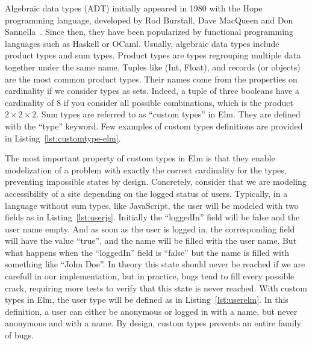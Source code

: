 Algebraic data types (ADT) initially appeared in 1980 with the Hope programming language,
developed by Rod Burstall, Dave MacQueen and Don Sannella~\cite{burstall1980hope}.
Since then, they have been popularized by functional programming languages
such as Haskell or OCaml.
Usually, algebraic data types include product types and sum types.
Product types are types regrouping multiple data together under the same name.
Tuples like (Int, Float), and records (or objects) are the most common product types.
Their names come from the properties on cardinality if we consider types as sets.
Indeed, a tuple of three booleans have a cardinality of 8 if you consider
all possible combinations, which is the product $2\times2\times2$.
Sum types are referred to as ``custom types'' in Elm.
They are defined with the ``type'' keyword.
Few examples of custom types definitions are provided in Listing~\ref{lst:customtype-elm}.



The most important property of custom types in Elm
is that they enable modelization of a problem with exactly the correct
cardinality for the types, preventing impossible states by design.
Concretely, consider that we are modeling accessibility of a site
depending on the logged status of users.
Typically, in a language without sum types, like JavaScript,
the user will be modeled with two fields as in Listing~\ref{lst:userjs}.
Initially the ``loggedIn'' field will be false and the user name empty.
And as soon as the user is logged in,
the corresponding field will have the value ``true'',
and the name will be filled with the user name.
But what happens when the ``loggedIn'' field is ``false'' but
the name is filled with something like ``John Doe''.
In theory this state should never be reached if we are carefull in our implementation,
but in practice, bugs tend to fill every possible crack,
requiring more tests to verify that this state is never reached.
With custom types in Elm, the user type will be defined as in Listing~\ref{lst:userelm}.
In this definition, a user can either be anonymous or logged in with a name,
but never anonymous and with a name.
By design, custom types prevents an entire family of bugs.






